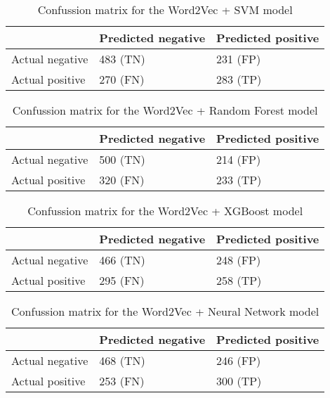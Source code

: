\begin{table}[H]
\centering
{
\makegapedcells
\begin{tabular}{lll}
                & Predicted negative & Predicted positive \\
\hline
Actual negative & 483 (TN)           & 231 (FP) \\
Actual positive & 270 (FN)           & 283 (TP) \\
\hline
\end{tabular}
}
\caption{Confussion matrix for the Word2Vec + SVM model}
\label{w2vsvm_cm}
\end{table}

\begin{table}[H]
\centering
{
\makegapedcells
\begin{tabular}{lll}
                & Predicted negative & Predicted positive \\
\hline
Actual negative & 500 (TN)           & 214 (FP) \\
Actual positive & 320 (FN)           & 233 (TP) \\
\hline
\end{tabular}
}
\caption{Confussion matrix for the Word2Vec + Random Forest model}
\label{w2vrf_cm}
\end{table}

\begin{table}[H]
\centering
{
\makegapedcells
\begin{tabular}{lll}
                & Predicted negative & Predicted positive \\
\hline
Actual negative & 466 (TN)           & 248 (FP) \\
Actual positive & 295 (FN)           & 258 (TP) \\
\hline
\end{tabular}
}
\caption{Confussion matrix for the Word2Vec + XGBoost model}
\label{w2vxgb_cm}
\end{table}

\begin{table}[H]
\centering
{
\makegapedcells
\begin{tabular}{lll}
                & Predicted negative & Predicted positive \\
\hline
Actual negative & 468 (TN)           & 246 (FP) \\
Actual positive & 253 (FN)           & 300 (TP) \\
\hline
\end{tabular}
}
\caption{Confussion matrix for the Word2Vec + Neural Network model}
\label{w2vnn_cm}
\end{table}


